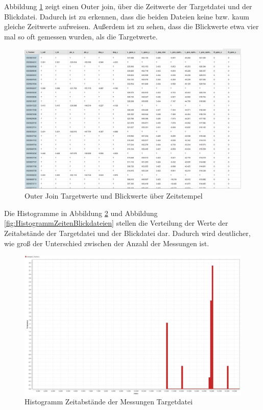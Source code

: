 Abbildung \ref{fig:OuterJoin} zeigt einen Outer join, \"uber die Zeitwerte der Targetdatei und der Blickdatei. Dadurch ist zu erkennen, dass die beiden Dateien keine bzw. kaum gleiche Zeitwerte aufweisen. Au\ss{}erdem ist zu sehen, dass die Blickwerte etwa vier mal so oft gemessen wurden, als die Targetwerte.

\begin{figure}[H]
	\noindent \begin{centering}
		\includegraphics[width=15cm]{pics/OuterJoin.png}
		\par\end{centering}
	\caption{\label{fig:OuterJoin}Outer Join Targetwerte und Blickwerte \"uber Zeitstempel}
\end{figure}

Die Histogramme in Abbildung \ref{fig:HistogrammZeitenTargetdateien} und Abbildung \ref{fig:HistogrammZeitenBlickdateien} stellen die Verteilung der Werte der Zeitabst\"ande der Targetdatei und der Blickdatei dar. Dadurch wird deutlicher, wie gro\ss{} der Unterschied zwischen der Anzahl der Messungen ist.

\begin{figure}[H]
	\noindent \begin{centering}
		\includegraphics[width=15cm]{pics/HistogrammZeitenTargetdateien.png}
		\par\end{centering}
	\caption{\label{fig:HistogrammZeitenTargetdateien}Histogramm Zeitabst\"ande der Messungen Targetdatei}
\end{figure}

